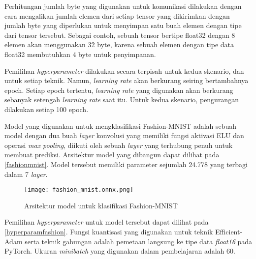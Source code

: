 Perhitungan jumlah byte yang digunakan untuk komunikasi dilakukan dengan cara mengalikan jumlah elemen dari setiap tensor yang dikirimkan dengan jumlah byte yang diperlukan untuk menyimpan satu buah elemen dengan tipe dari tensor tersebut. Sebagai contoh, sebuah tensor bertipe float32 dengan 8 elemen akan menggunakan 32 byte, karena sebuah elemen dengan tipe data float32 membutuhkan 4 byte untuk penyimpanan.

Pemilihan \emph{hyperparameter} dilakukan secara terpisah untuk kedua skenario, dan untuk setiap teknik. Namun, \emph{learning rate} akan berkurang seiring bertambahnya epoch. Setiap epoch tertentu, \emph{learning rate} yang digunakan akan berkurang sebanyak setengah \emph{learning rate} saat itu. Untuk kedua skenario, pengurangan dilakukan setiap 100 epoch.

Model yang digunakan untuk mengklasifikasi Fashion-MNIST adalah sebuah model dengan dua buah \emph{layer} konvolusi yang memiliki fungsi aktivasi ELU dan operasi \emph{max pooling}, diikuti oleh sebuah \emph{layer} yang terhubung penuh untuk membuat prediksi. Arsitektur model yang dibangun dapat dilihat pada \autoref{fashionmnist}. Model tersebut memiliki parameter sejumlah 24.778 yang terbagi dalam 7 \emph{layer}.

\begin{figure}
  \centering
  \texttt{[image: fashion\_mnist.onnx.png]}
  \caption{Arsitektur model untuk klasifikasi Fashion-MNIST}\label{fashionmnist}
\end{figure}

Pemilihan \emph{hyperparameter} untuk model tersebut dapat dilihat pada \autoref{hyperparamfashion}. Fungsi kuantisasi yang digunakan untuk teknik Efficient-Adam serta teknik gabungan adalah pemetaan langsung ke tipe data \emph{float16} pada PyTorch. Ukuran \emph{minibatch} yang digunakan dalam pembelajaran adalah 60.

